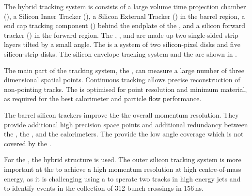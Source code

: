 The hybrid  tracking system is consists of a large volume time projection chamber (\TPC), a Silicon Inner Tracker (\SIT), a Silicon External Tracker (\SET) in the barrel region, a end cap tracking component (\ETD) behind the endplate of the \TPC, and a silicon forward tracker (\FTD) in the forward region. The \SIT, \SET, and \ETD are made up two single-sided strip layers tilted by a small angle. The \FTD is a system of two silicon-pixel disks and five silicon-strip disks.  The silicon envelope tracking system and the \TPC are shown in .


The main part of the tracking system, the \TPC, can measure a large number of three dimensional spatial points. Continuous tracking allows precise reconstruction of non-pointing tracks. The \TPC is optimised for point resolution and minimum material, as required for the best calorimeter and particle flow performance.

The barrel silicon trackers improve the the overall momentum resolution. They provide additional high precision space points and additional redundancy between the \TPC, the \VTX, and the calorimeters. The \FTD provide the low angle coverage which is not covered by the \TPC.

For the \CLICILD, the hybrid structure is used. The outer silicon tracking system is more important at the \CLIC to achieve a high momentum resolution at high centre-of-mass energy, as it is challenging using a \TPC to sperate two tracks in high energy jets and to identify events in the collection of 312 bunch crossings in 156\,ns.

